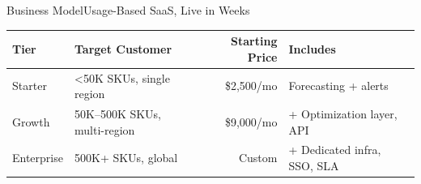 \begin{frame}{Business Model}{Usage-Based SaaS, Live in Weeks}

  \centering
  {
  \renewcommand{\arraystretch}{1.35}
  \begin{tabular}{l l r l}
    \toprule
    \rowcolor{bgPanel}
    \textcolor{textLight}{\textbf{Tier}} & \textcolor{textLight}{\textbf{Target Customer}} & \textcolor{textLight}{\textbf{Starting Price}} & \textcolor{textLight}{\textbf{Includes}} \\
    \midrule
    Starter    & \textless{}50K SKUs, single region   & \$2,500/mo & Forecasting + alerts \\
    \rowcolor{bgPanel}
    Growth     & 50K--500K SKUs, multi-region          & \$9,000/mo & + Optimization layer, API \\
    Enterprise & 500K+ SKUs, global                    & Custom     & + Dedicated infra, SSO, SLA \\
    \bottomrule
  \end{tabular}}

  \vspace{0.5cm}

  \begin{minipage}[t]{0.23\textwidth}
    \begin{statcard}
    \end{statcard}
  \end{minipage}\hfill
  \begin{minipage}[t]{0.23\textwidth}
    \begin{statcard}
    \end{statcard}
  \end{minipage}\hfill
  \begin{minipage}[t]{0.23\textwidth}
    \begin{statcard}
    \end{statcard}
  \end{minipage}\hfill
  \begin{minipage}[t]{0.23\textwidth}
    \begin{statcard}
    \end{statcard}
  \end{minipage}
  \par

\end{frame}
